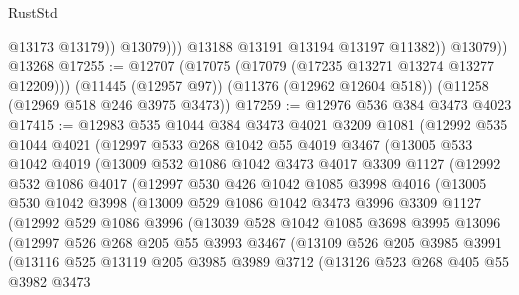 \begin{lexlean}{RustStd}
\begin{coremodule}
{\begin{coremodule}
{{{{{{{{{{{{{{{{{{{{{{{{{{{{{{{{{{{{{{{{{{{{{{{{{{{{{{{{{{{{{{{{{{{{{{{{{{{{{{{{{{{{{                      @13173
                      @13179))
                  @13079)))
            @13188
            @13191
            @13194
            @13197
            @11382))
        @13079))
    @13268
@17255 := @12707
    (@17075 (@17079 (@17235 @13271 @13274 @13277 @12209)))
    (@11445 (@12957 @97))
    (@11376 (@12962 @12604 @518))
    (@11258 (@12969 @518 @246 @3975 @3473))
@17259 := @12976 @536 @384 @3473 @4023
@17415 := @12983
    @535
    @1044
    @384
    @3473
    @4021
    @3209
    @1081
    (@12992
      @535
      @1044
      @4021
      (@12997
        @533
        @268
        @1042
        @55
        @4019
        @3467
        (@13005
          @533
          @1042
          @4019
          (@13009
            @532
            @1086
            @1042
            @3473
            @4017
            @3309
            @1127
            (@12992
              @532
              @1086
              @4017
              (@12997
                @530
                @426
                @1042
                @1085
                @3998
                @4016
                (@13005
                  @530
                  @1042
                  @3998
                  (@13009
                    @529
                    @1086
                    @1042
                    @3473
                    @3996
                    @3309
                    @1127
                    (@12992
                      @529
                      @1086
                      @3996
                      (@13039
                        @528
                        @1042
                        @1085
                        @3698
                        @3995
                        @13096
                        (@12997
                          @526
                          @268
                          @205
                          @55
                          @3993
                          @3467
                          (@13109
                            @526
                            @205
                            @3985
                            @3991
                            (@13116
                              @525
                              @13119
                              @205
                              @3985
                              @3989
                              @3712
                              (@13126
                                @523
                                @268
                                @405
                                @55
                                @3982
                                @3473
}}}}}}}}}}}}}}}}}}}}}}}}}}}}}}}}}}}}}}}}}}}}}}}}}}}}}}}}}}}}}}}}}}}}}}}}}}}}}}}}}}}}}
\end{coremodule}}
\end{coremodule}
\end{lexlean}
